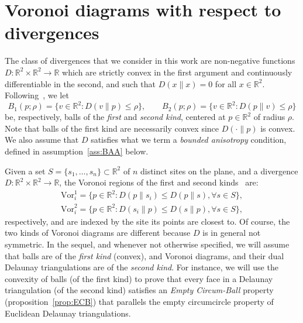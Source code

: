 \documentclass[11pt]{article}
\newcommand{\Sites}{S}
\newcommand{\Vor}{\text{Vor}}
\newcommand{\D}[2]{D\left(#1 \parallel #2\right)}
\begin{document}
\section{Voronoi diagrams with respect to divergences}\label{sec:setup}

The class of divergences that we consider in this work are non-negative functions 
	$D:\mathbb{R}^2\times\mathbb{R}^2\rightarrow\mathbb{R}$ 
	which are 	strictly convex in the first argument and continuously differentiable in the second, 
	and such that $\D{x}{x}=0$ for all $x\in\mathbb{R}^2$. 
Following~\cite{Bregman}, we let
\begin{equation}\label{eq:defball}
B_1(p; \rho) = \{v\in\mathbb{R}^2 : \D{v}{p} \le \rho\}, \quad\quad B_2(p;\rho) = \{v\in\mathbb{R}^2 : \D{p}{v} \le \rho\} 
\end{equation}
be, respectively, balls of the \emph{first} and \emph{second kind}, centered at $p\in\mathbb{R}^2$ of radius $\rho$. 
Note that balls of the first kind are necessarily convex since $\D{\cdot}{p}$ is convex. 
We also assume that $D$ satisfies what we term a \emph{bounded anisotropy} condition, 
	defined in assumption~\ref{ass:BAA} below. 

Given a set $\Sites=\{s_1,\dots,s_n\}\subset\mathbb{R}^2$ of 
$n$ distinct sites on the plane, and a divergence $D:\mathbb{R}^2\times\mathbb{R}^2\rightarrow\mathbb{R}$, 
the Voronoi regions 
of the first and second kinds~\cite{Bregman} are:  
\begin{eqnarray}
\label{eq:defvor1}   {\Vor^1_i} = \{p\in\mathbb{R}^2 : \D{p}{s_i} \le \D{p}{s}, \forall s\in \Sites \}, \\
\label{eq:defvor2}   {\Vor^2_i} = \{p\in\mathbb{R}^2 : \D{s_i}{p} \le \D{s}{p}, \forall s\in \Sites \}, 
\end{eqnarray}
respectively, and are indexed by the site its points are closest to.  
Of course, the two kinds of Voronoi diagrams are different because $D$ is in general not symmetric. 
In the sequel, and whenever not otherwise specified, we will assume that balls are of the \emph{first kind} (convex), 
	and Voronoi diagrams, and their dual Delaunay triangulations are of the \emph{second kind}. 
For instance, we will use the convexity of balls (of the first kind) to prove 
	that every face in a Delaunay triangulation (of the second kind) 
	satisfies an \emph{Empty Circum-Ball} property (proposition~\ref{prop:ECB}) 
	that parallels the empty circumcircle property of Euclidean Delaunay triangulations. 
\end{document}
